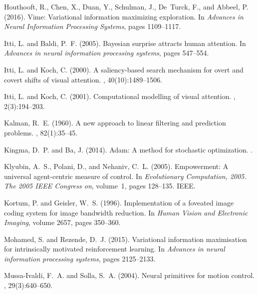 \documentclass[12pt,twoside,openright]{article}
\begin{document}
{\begin{thebibliography}{}
	Houthooft, R., Chen, X., Duan, Y., Schulman, J., De~Turck, F., and Abbeel, P.
	(2016).
	\newblock Vime: Variational information maximizing exploration.
	\newblock In {\em Advances in Neural Information Processing Systems}, pages
	1109--1117.
	
	Itti, L. and Baldi, P.~F. (2005).
	\newblock Bayesian surprise attracts human attention.
	\newblock In {\em Advances in neural information processing systems}, pages
	547--554.
	
	Itti, L. and Koch, C. (2000).
	\newblock A saliency-based search mechanism for overt and covert shifts of
	visual attention.
	, 40(10):1489--1506.
	
	Itti, L. and Koch, C. (2001).
	\newblock Computational modelling of visual attention.
	, 2(3):194--203.
	
	Kalman, R.~E. (1960).
	\newblock A new approach to linear filtering and prediction problems.
	, 82(1):35--45.
	
	Kingma, D.~P. and Ba, J. (2014).
	\newblock Adam: A method for stochastic optimization.
	.
	
	Klyubin, A.~S., Polani, D., and Nehaniv, C.~L. (2005).
	\newblock Empowerment: A universal agent-centric measure of control.
	\newblock In {\em Evolutionary Computation, 2005. The 2005 IEEE Congress on},
	volume~1, pages 128--135. IEEE.
	
	Kortum, P. and Geisler, W.~S. (1996).
	\newblock Implementation of a foveated image coding system for image bandwidth
	reduction.
	\newblock In {\em Human Vision and Electronic Imaging}, volume 2657, pages
	350--360.
	
	Mohamed, S. and Rezende, D.~J. (2015).
	\newblock Variational information maximisation for intrinsically motivated
	reinforcement learning.
	\newblock In {\em Advances in neural information processing systems}, pages
	2125--2133.
	
	Mussa-Ivaldi, F.~A. and Solla, S.~A. (2004).
	\newblock Neural primitives for motion control.
	, 29(3):640--650.
	

\end{thebibliography}}
\end{document}

